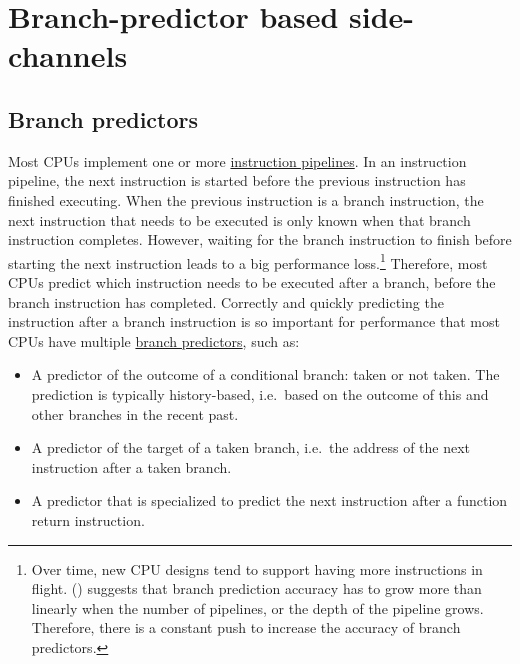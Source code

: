 \documentclass[
  a4paper,
]{report}
\providecommand{\tightlist}{%
  \setlength{\itemsep}{0pt}\setlength{\parskip}{0pt}}
\begin{document}
\section{Branch-predictor based
side-channels}\label{branch-predictor-based-side-channels}

\subsection{Branch predictors}\label{branch-predictors}

Most CPUs implement one or more
\href{https://en.wikipedia.org/wiki/Instruction_pipelining}{\label{__index_entry_142}{instruction
pipelines}}.
\label{__index_entry_143}{} In an
instruction pipeline, the next instruction is started before the
previous instruction has finished executing. When the previous
instruction is a branch instruction, the next instruction that needs to
be executed is only known when that branch instruction completes.
However, waiting for the branch instruction to finish before starting
the next instruction leads to a big performance loss.\footnote{Over
  time, new CPU designs tend to support having more instructions in
  flight. ()
  suggests that branch prediction accuracy has to grow more than
  linearly when the number of pipelines, or the depth of the pipeline
  grows. Therefore, there is a constant push to increase the accuracy of
  branch predictors.} Therefore, most CPUs
\label{__index_entry_144}{predict} which
instruction needs to be executed after a branch, before the branch
instruction has completed. Correctly and quickly predicting the
instruction after a branch instruction is so important for performance
that most CPUs have multiple
\href{https://en.wikipedia.org/wiki/Branch_predictor}{\label{__index_entry_145}{branch
predictors}}, such as:

\begin{itemize}
\tightlist
\item
  A predictor of the outcome of a
  \label{__index_entry_146}{conditional
  branch}:
  \label{__index_entry_147}{taken} or
  not taken. The prediction is typically
  \label{__index_entry_148}{history-based},
  i.e.~based on the outcome of this and other branches in the recent
  past.
\item
  A predictor of the \label{__index_entry_149}{target of
  a taken branch}, i.e.~the address of
  the next instruction after a taken branch.
\item
  A predictor that is specialized to
  \label{__index_entry_150}{predict the next instruction
  after a function return instruction}.
\end{itemize}
\end{document}
